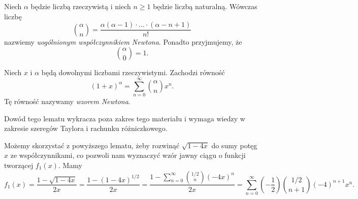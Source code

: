 \documentclass[shortabstract]{imthesis}
\begin{document}
    \begin{definition}
    Niech $\alpha$ będzie liczbą rzeczywistą i niech $n \geq 1$ będzie liczbą naturalną. Wówczas liczbę
    $$
    {\alpha \choose n} = \frac{\alpha(\alpha-1)\cdot\ldots\cdot(\alpha-n+1)}{n!}
    $$
    nazwiemy \emph{uogólnionym współczynnikiem Newtona}. Ponadto przyjmujemy, że
    $$
    {\alpha \choose 0} = 1.
    $$
    \end{definition}
    
    \begin{lemma}
    Niech $x$ i $\alpha$ będą dowolnymi liczbami rzeczywistymi. Zachodzi równość
    $$
    (1+x)^\alpha = \sum_{n=0}^\infty {\alpha \choose n} x^n. 
    $$
    Tę równość nazywamy \emph{wzorem Newtona}.
    \end{lemma}
    Dowód tego lematu wykracza poza zakres tego materiału i wymaga wiedzy w zakresie szeregów Taylora i rachunku różniczkowego.
    
    Możemy skorzystać z powyższego lematu, żeby rozwinąć $\sqrt{1-4x}$ do sumy potęg $x$ ze współczynnikami, co pozwoli nam wyznaczyć wzór jawny ciągu o funkcji tworzącej $f_1(x)$. Mamy
    $$
    f_1(x) = \frac{1-\sqrt{1-4x}}{2x} = \frac{1-(1-4x)^{1/2}}{2x} = \frac{1-\sum_{n=0}^\infty {1/2 \choose n} (-4x)^n}{2x} = \sum_{n=0}^\infty \left(-\frac12\right){1/2 \choose n+1} (-4)^{n+1} x^n.
    $$
    
\end{document}
